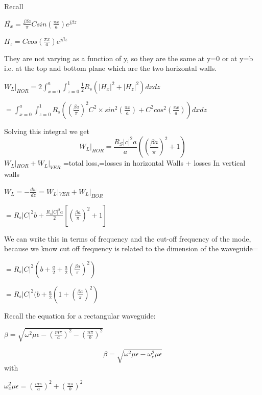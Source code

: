 Recall
\begin{center}
$\bar{H_x} = \frac{j\beta a}{\pi}Csin(\frac{\pi x}{a})e^{j\beta z}$
\end{center}
\begin{center}
$H_z=Ccos(\frac{\pi x}{a})e^{j\beta z}$
\end{center}
They are not varying as a function of y, so they are the same at y=0 or at y=b i.e. at the top and bottom plane which are the two horizontal walls.
\begin{center}
$W_L|_{HOR} = 2\int_{x=0}^{a}\int_{z=0}^{1}\frac{1}{2}R_s(|H_x|^2 + |H_z|^2)dxdz$
\end{center}
\begin{center}
$=\int_{x=0}^{a}\int_{z=0}^{1}R_s ((\frac{\beta a}{\pi})^2C^2 \times sin^2(\frac{\pi x}{a})+ C^2cos^2(\frac{\pi x}{a}))dxdz$	
\end{center}
Solving this integral we get
\begin{equation}
W_L|_{HOR} = \frac{R_S|c|^2 a}{a}\left(\left(\frac{\beta a}{\pi}\right)^2 +1\right)
\end{equation}
$W_L|_{HOR} + W_L|_{VER}$ =total loss,=losses in horizontal Walls + losses In vertical walls
\begin{center}
$W_L=-\frac{dw}{dz}=W_L|_{VER}+W_L|_{HOR}$	
\end{center}
\begin{center}
$=R_s|C|^2b+\frac{R_s|C|^2a}{2}[(\frac{\beta a}{\pi})^2+1]$	
\end{center}
We can write this in terms of frequency and the cut-off frequency of the mode, because we know cut off frequency is related to the dimension of the waveguide=
\begin{center}
$=R_s|C|^2 (b + \frac{a}{2} + \frac{a}{2}(\frac{\beta a}{\pi})^2)$	
\end{center}
\begin{center}
$ =R_s|C|^2(b+\frac{a}{2}(1+(\frac{\beta a}{\pi})^2)$	
\end{center}
Recall the equation for a rectangular waveguide: 
\begin{center}
$\beta=\sqrt{{\omega}^2\mu\epsilon-(\frac{m\pi}{a})^2-(\frac{n\pi}{b})^2}$	
\end{center}
\begin{equation}
\beta = \sqrt{\omega^{2} \mu\epsilon-\omega_c^{2} \mu\epsilon}
\end{equation}
with
\begin{center}
$\omega_c^2\mu\epsilon=(\frac{m\pi}{a})^2+(\frac{n\pi}{b})^2$	
\end{center}
